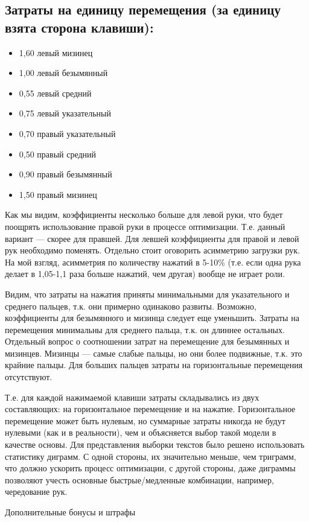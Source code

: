 \documentclass[14pt]{article} %
\begin{document}
\subsection{Затраты на единицу перемещения (за единицу взята сторона клавиши):}
\begin{itemize}
\item
1,60 левый мизинец
\item
1,00 левый безымянный
\item
0,55 левый средний
\item
0,75 левый указательный
\item
0,70 правый указательный
\item
0,50 правый средний
\item
0,90 правый безымянный
\item
1,50 правый мизинец
\end{itemize}

Как мы видим, коэффициенты несколько больше для левой руки, что будет поощрять использование правой руки в процессе оптимизации. Т.е. данный вариант — скорее для правшей. Для левшей коэффициенты для правой и левой рук необходимо поменять.
Отдельно стоит оговорить асимметрию загрузки рук. На мой взгляд, асимметрия по количеству нажатий в 5-10\% (т.е. если одна рука делает в 1,05-1,1 раза больше нажатий, чем другая) вообще не играет роли.

Видим, что затраты на нажатия приняты минимальными для указательного и среднего пальцев, т.к. они примерно одинаково развиты. Возможно, коэффициенты для безымянного и мизинца следует еще уменьшить.
Затраты на перемещения минимальны для среднего пальца, т.к. он длиннее остальных. Отдельный вопрос о соотношении затрат на перемещение для безымянных и мизинцев. Мизинцы — самые слабые пальцы, но они более подвижные, т.к. это крайние пальцы.
Для больших пальцев затраты на горизонтальные перемещения отсутствуют.

Т.е. для каждой нажимаемой клавиши затраты складывались из двух составляющих: на горизонтальное перемещение и на нажатие. Горизонтальное перемещение может быть нулевым, но суммарные затраты никогда не будут нулевыми (как и в реальности), чем и объясняется выбор такой модели в качестве основы.
Для представления выборки текстов было решено использовать статистику диграмм. С одной стороны, их значительно меньше, чем триграмм, что должно ускорить процесс оптимизации, с другой стороны, даже диграммы позволяют учесть основные быстрые/медленные комбинации, например, чередование рук.

Дополнительные бонусы и штрафы
\end{document}

